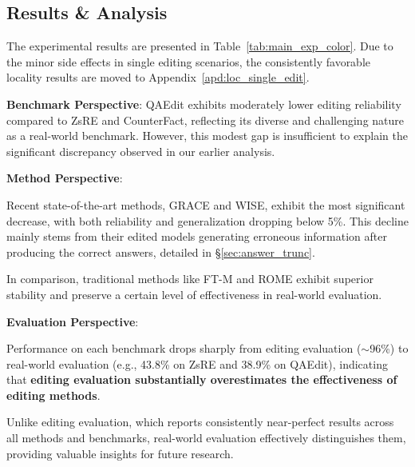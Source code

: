 \subsection{Results \& Analysis}
\label{sec:single_result}

The experimental results are presented in Table~\ref{tab:main_exp_color}.
Due to the minor side effects in single editing scenarios, the consistently favorable locality results are moved to Appendix~\ref{apd:loc_single_edit}.

\noindent\textbf{Benchmark Perspective}:
QAEdit exhibits moderately lower editing reliability compared to ZsRE and CounterFact, reflecting its diverse and challenging nature as a real-world benchmark.
However, this modest gap is insufficient to explain the significant discrepancy observed in our earlier analysis.

\noindent \textbf{Method Perspective}:
\begin{enumerate*}[label=\roman*)]
    \item Recent state-of-the-art methods, GRACE and WISE, exhibit the most significant decrease, with both reliability and generalization dropping below 5\%.
    This decline mainly stems from their edited models generating erroneous information after producing the correct answers, detailed in \S\ref{sec:answer_trunc}.
    \item In comparison, traditional methods like FT-M and ROME exhibit superior stability and preserve a certain level of effectiveness in real-world evaluation.
\end{enumerate*}

\noindent \textbf{Evaluation Perspective}:
\begin{enumerate*}[label=\roman*)]
    \item Performance on each benchmark drops sharply from editing evaluation ($\sim$96\%) to real-world evaluation (e.g., 43.8\% on ZsRE and 38.9\% on QAEdit), indicating that \textbf{editing evaluation substantially overestimates the effectiveness of editing methods}.
    \item Unlike editing evaluation, which reports consistently near-perfect results across all methods and benchmarks, real-world evaluation effectively distinguishes them, providing valuable insights for future research.
\end{enumerate*}



